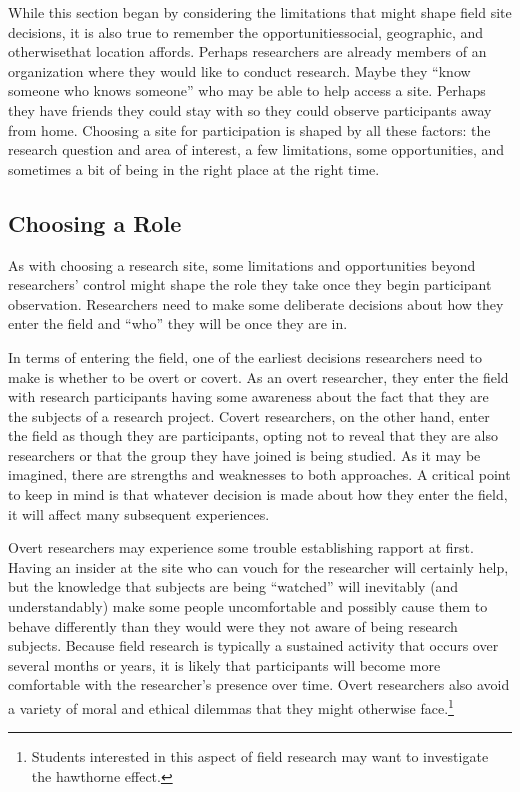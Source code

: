 While this section began by considering the limitations that might shape field site decisions, it is also true to remember the opportunities\textemdash social, geographic, and otherwise\textemdash that location affords. Perhaps researchers are already members of an organization where they would like to conduct research. Maybe they ``know someone who knows someone'' who may be able to help access a site. Perhaps they have friends they could stay with so they could observe participants away from home. Choosing a site for participation is shaped by all these factors: the research question and area of interest, a few limitations, some opportunities, and sometimes a bit of being in the right place at the right time.

\subsection{Choosing a Role}

As with choosing a research site, some limitations and opportunities beyond researchers' control might shape the role they take once they begin participant observation. Researchers need to make some deliberate decisions about how they enter the field and ``who'' they will be once they are in.

In terms of entering the field, one of the earliest decisions researchers need to make is whether to be overt or covert. As an overt researcher, they enter the field with research participants having some awareness about the fact that they are the subjects of a research project. Covert researchers, on the other hand, enter the field as though they are participants, opting not to reveal that they are also researchers or that the group they have joined is being studied. As it may be imagined, there are strengths and weaknesses to both approaches. A critical point to keep in mind is that whatever decision is made about how they enter the field, it will affect many subsequent experiences.

Overt researchers may experience some trouble establishing rapport at first. Having an insider at the site who can vouch for the researcher will certainly help, but the knowledge that subjects are being ``watched'' will inevitably (and understandably) make some people uncomfortable and possibly cause them to behave differently than they would were they not aware of being research subjects. Because field research is typically a sustained activity that occurs over several months or years, it is likely that participants will become more comfortable with the researcher's presence over time. Overt researchers also avoid a variety of moral and ethical dilemmas that they might otherwise face.\footnote{Students interested in this aspect of field research may want to investigate the \Gls{hawthorne} effect.}

